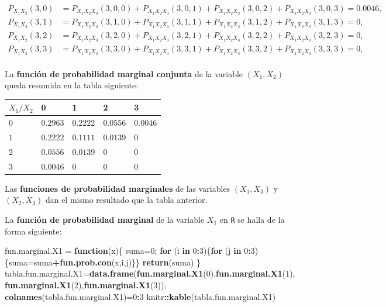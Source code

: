\documentclass[]{book}
\newenvironment{Shaded}{\begin{snugshade}}{\end{snugshade}}
\newcommand{\ControlFlowTok}[1]{\textcolor[rgb]{0.13,0.29,0.53}{\textbf{#1}}}
\newcommand{\DecValTok}[1]{\textcolor[rgb]{0.00,0.00,0.81}{#1}}
\newcommand{\KeywordTok}[1]{\textcolor[rgb]{0.13,0.29,0.53}{\textbf{#1}}}
\newcommand{\NormalTok}[1]{#1}
\newcommand{\OperatorTok}[1]{\textcolor[rgb]{0.81,0.36,0.00}{\textbf{#1}}}
\newcommand{\StringTok}[1]{\textcolor[rgb]{0.31,0.60,0.02}{#1}}
\begin{document}
\[
\begin{array}{rl}
P_{X_1X_2}(3,0) & = P_{X_1X_2X_3}(3,0,0)+P_{X_1X_2X_3}(3,0,1)+P_{X_1X_2X_3}(3,0,2)+P_{X_1X_2X_3}(3,0,3)=0.0046, \\
P_{X_1X_2}(3,1) & = P_{X_1X_2X_3}(3,1,0)+P_{X_1X_2X_3}(3,1,1)+P_{X_1X_2X_3}(3,1,2)+P_{X_1X_2X_3}(3,1,3)=0, \\
P_{X_1X_2}(3,2) & = P_{X_1X_2X_3}(3,2,0)+P_{X_1X_2X_3}(3,2,1)+P_{X_1X_2X_3}(3,2,2)+P_{X_1X_2X_3}(3,2,3)=0, \\
P_{X_1X_2}(3,3) & = P_{X_1X_2X_3}(3,3,0)+P_{X_1X_2X_3}(3,3,1)+P_{X_1X_2X_3}(3,3,2)+P_{X_1X_2X_3}(3,3,3)=0, \\
\end{array}
\]

La \textbf{función de probabilidad marginal conjunta} de la variable \((X_1,X_2)\) queda resumida en la tabla siguiente:

\begin{longtable}[]{@{}lllll@{}}
\toprule
\(X_1/X_2\) & 0 & 1 & 2 & 3\tabularnewline
\midrule
\endhead
\(0\) & \(0.2963\) & \(0.2222\) & \(0.0556\) & \(0.0046\)\tabularnewline
\(1\) & \(0.2222\) & \(0.1111\) & \(0.0139\) & \(0\)\tabularnewline
\(2\) & \(0.0556\) & \(0.0139\) & \(0\) & \(0\)\tabularnewline
\(3\) & \(0.0046\) & \(0\) & \(0\) & \(0\)\tabularnewline
\bottomrule
\end{longtable}

Las \textbf{funciones de probabilidad marginales} de las variables \((X_1,X_3)\) y \((X_2,X_3)\) dan el mismo resultado que la tabla anterior.

La \textbf{función de probabilidad marginal} de la variable \(X_1\) en \texttt{R} se halla de la forma siguiente:

\begin{Shaded}
\begin{Highlighting}[]
\NormalTok{fun.marginal.X1 =}\StringTok{ }\ControlFlowTok{function}\NormalTok{(x)\{}
\NormalTok{  suma=}\DecValTok{0}\NormalTok{;}
  \ControlFlowTok{for}\NormalTok{ (i }\ControlFlowTok{in} \DecValTok{0}\OperatorTok{:}\DecValTok{3}\NormalTok{)\{}\ControlFlowTok{for}\NormalTok{ (j }\ControlFlowTok{in} \DecValTok{0}\OperatorTok{:}\DecValTok{3}\NormalTok{)\{suma=suma}\OperatorTok{+}\KeywordTok{fun.prob.con}\NormalTok{(x,i,j)\}\}}
  \KeywordTok{return}\NormalTok{(suma)}
\NormalTok{\}}
\NormalTok{tabla.fun.marginal.X1=}\KeywordTok{data.frame}\NormalTok{(}\KeywordTok{fun.marginal.X1}\NormalTok{(}\DecValTok{0}\NormalTok{),}\KeywordTok{fun.marginal.X1}\NormalTok{(}\DecValTok{1}\NormalTok{),}
                            \KeywordTok{fun.marginal.X1}\NormalTok{(}\DecValTok{2}\NormalTok{),}\KeywordTok{fun.marginal.X1}\NormalTok{(}\DecValTok{3}\NormalTok{));}
\KeywordTok{colnames}\NormalTok{(tabla.fun.marginal.X1)=}\DecValTok{0}\OperatorTok{:}\DecValTok{3}
\NormalTok{knitr}\OperatorTok{::}\KeywordTok{kable}\NormalTok{(tabla.fun.marginal.X1)}
\end{Highlighting}
\end{Shaded}
\end{document}
